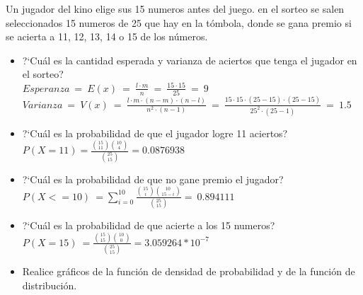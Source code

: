 Un jugador del kino elige sus 15 numeros antes del juego. en el sorteo se salen seleccionados 15 numeros de 25 que hay en la t\'ombola,
donde se gana premio si se acierta a 11, 12, 13, 14 o 15 de los n\'umeros.
%
\begin{itemize} 
	\item ?`Cu\'al es la cantidad esperada y varianza de aciertos que tenga el jugador en el sorteo?\\
		$Esperanza\ =\ E(x)\ =\ \frac{l\cdot m}{n}\ =\ \frac{15\cdot 15}{25}\ =\ 9$\\
		$Varianza\ =\ V(x)\ =\ \frac{l\cdot m\cdot (n-m)\cdot (n-l)}{n^{2}\cdot (n-1)}\ =\ \frac{15\cdot 15\cdot (25-15)\cdot (25-15)}{25^{2}\cdot (25-1)}\ =\ 1.5$\\
	\item ?`Cu\'al es la probabilidad de que el jugador logre 11 aciertos?\\
		$P(X=11) = \frac{{15 \choose 11}{10 \choose 4}}{{25\choose 15}} = 0.0876938$
	\item ?`Cu\'al es la probabilidad de que no gane premio el jugador?\\
		$P(X<=10)\ = \sum_{i=0}^{10} \frac{{15 \choose i}{10 \choose 15-i}}{{25\choose 15}}   =\ 0.894111$\\
	\item ?`Cu\'al es la probabilidad de que acierte a los 15 numeros?\\
		$P(X=15)\ = \frac{{15 \choose 15}{10 \choose 0}}{{25\choose 15}} = 3.059264*10^{-7}$\\
	\item Realice gr\'aficos de la funci\'on de densidad de probabilidad y de la funci\'on de distribuci\'on.\\

\end{itemize}
